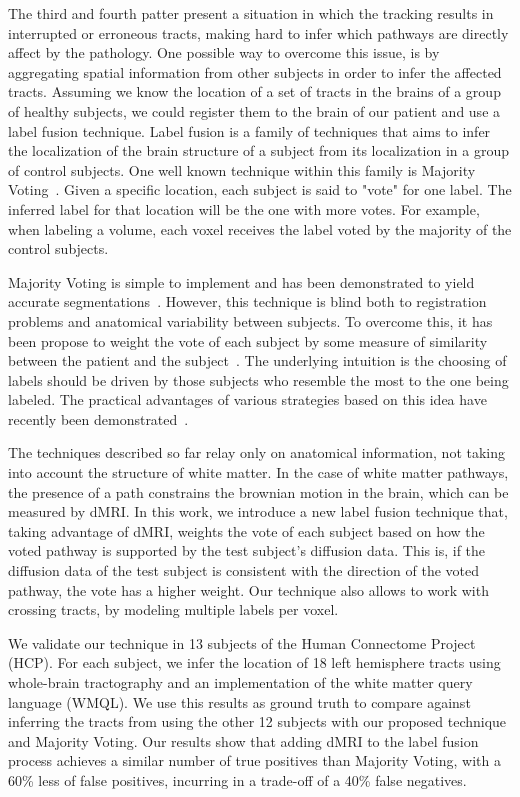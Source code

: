 The third and fourth patter present a situation in which the tracking results in
interrupted or erroneous tracts, making hard to infer which pathways are directly
affect by the pathology. One
possible way to overcome this issue, is by aggregating spatial information
from other subjects in order to infer the affected tracts. Assuming we know the
location of a set of tracts in the brains of a group of healthy subjects, we
could register them to the brain of our patient and use a label fusion technique.
Label fusion is a family of techniques that aims to infer the localization of the
brain structure of a subject from its localization in a group of control subjects.
One well known technique within this family is Majority Voting~\cite{Xu1992}. Given a
specific location, each subject is said to "vote" for one label. The inferred
label for that location will be the one with more votes. For example, when
labeling a volume, each voxel receives the label voted by the majority of the
control subjects.

Majority Voting is simple to implement and has been demonstrated to yield
accurate segmentations~\cite{Asman2013}. However, this technique is blind both to
registration problems and anatomical variability between subjects. To overcome
this, it has been propose to weight the vote of each subject by some measure of
similarity between the patient and the subject~\cite{Pictorial2004}. The underlying
intuition is the choosing of labels should be driven by those subjects who
resemble the most to the one being labeled. The practical advantages of various
strategies based on this idea have recently been demonstrated~\cite{Artaechevarria2009}.

The techniques described so far relay only on anatomical information, not taking 
into account the structure of white matter. In the case of white matter pathways,
the presence of a path constrains the brownian motion in the brain, which can be
measured by dMRI. In this work, we introduce a new label fusion technique that,
taking advantage of dMRI, weights the vote of each subject based on how the voted
pathway is supported by the test subject's diffusion data. This is, if the
diffusion data of the test subject is consistent with the direction of the voted
pathway, the vote has a higher weight. Our technique also allows to work with
crossing tracts, by modeling multiple labels per voxel.

We validate our technique in 13 subjects of the Human Connectome Project (HCP).
For each subject, we infer the location of 18 left hemisphere tracts using
whole-brain tractography and an implementation of the white matter query language
(WMQL). We use this results as ground truth to compare against inferring the
tracts from using the other 12 subjects with our proposed technique and Majority
Voting. Our results show that adding dMRI to the label fusion process achieves a
similar number of true positives than Majority Voting, with a 60\% less of
false positives, incurring in a trade-off of a 40\% false negatives.


